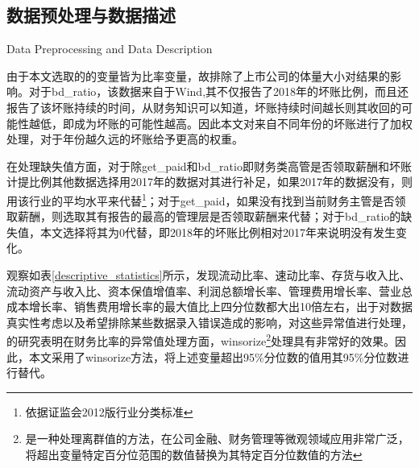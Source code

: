 \subsection{数据预处理与数据描述}{Data Preprocessing and Data Description}

由于本文选取的的变量皆为比率变量，故排除了上市公司的体量大小对结果的影响。对于bd\_ratio，该数据来自于Wind,其不仅报告了2018年的坏账比例，而且还报告了该坏账持续的时间，从财务知识可以知道，坏账持续时间越长则其收回的可能性越低，即成为坏账的可能性越高。因此本文对来自不同年份的坏账进行了加权处理，对于年份越久远的坏账给予更高的权重。


在处理缺失值方面，对于除get\_paid和bd\_ratio即财务类高管是否领取薪酬和坏账计提比例其他数据选择用2017年的数据对其进行补足，如果2017年的数据没有，则用该行业的平均水平来代替\footnote{依据证监会2012版行业分类标准}；对于get\_paid，如果没有找到当前财务主管是否领取薪酬，则选取其有报告的最高的管理层是否领取薪酬来代替；对于bd\_ratio的缺失值，本文选择将其为0代替，即2018年的坏账比例相对2017年来说明没有发生变化。


观察如表\ref{descriptive_statistics}所示，发现流动比率、速动比率、存货与收入比、流动资产与收入比、资本保值增值率、利润总额增长率、管理费用增长率、营业总成本增长率、销售费用增长率的最大值比上四分位数都大出10倍左右，出于对数据真实性考虑以及希望排除某些数据录入错误造成的影响，对这些异常值进行处理，\citep{winsorization}的研究表明在财务比率的异常值处理方面，winsorize\footnote{是一种处理离群值的方法，在公司金融、财务管理等微观领域应用非常广泛，将超出变量特定百分位范围的数值替换为其特定百分位数值的方法}处理具有非常好的效果。因此，本文采用了winsorize方法，将上述变量超出95\%分位数的值用其95\%分位数进行替代。

